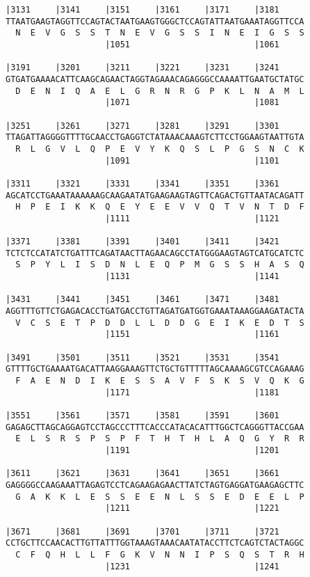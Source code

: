 \documentclass{article}
\begin{document}
\begin{Verbatim}
|3131     |3141     |3151     |3161     |3171     |3181     
TTAATGAAGTAGGTTCCAGTACTAATGAAGTGGGCTCCAGTATTAATGAAATAGGTTCCA
  N  E  V  G  S  S  T  N  E  V  G  S  S  I  N  E  I  G  S  S
                    |1051                         |1061     
  
|3191     |3201     |3211     |3221     |3231     |3241     
GTGATGAAAACATTCAAGCAGAACTAGGTAGAAACAGAGGGCCAAAATTGAATGCTATGC
  D  E  N  I  Q  A  E  L  G  R  N  R  G  P  K  L  N  A  M  L
                    |1071                         |1081     
  
|3251     |3261     |3271     |3281     |3291     |3301     
TTAGATTAGGGGTTTTGCAACCTGAGGTCTATAAACAAAGTCTTCCTGGAAGTAATTGTA
  R  L  G  V  L  Q  P  E  V  Y  K  Q  S  L  P  G  S  N  C  K
                    |1091                         |1101     
  
|3311     |3321     |3331     |3341     |3351     |3361     
AGCATCCTGAAATAAAAAAGCAAGAATATGAAGAAGTAGTTCAGACTGTTAATACAGATT
  H  P  E  I  K  K  Q  E  Y  E  E  V  V  Q  T  V  N  T  D  F
                    |1111                         |1121     
  
|3371     |3381     |3391     |3401     |3411     |3421     
TCTCTCCATATCTGATTTCAGATAACTTAGAACAGCCTATGGGAAGTAGTCATGCATCTC
  S  P  Y  L  I  S  D  N  L  E  Q  P  M  G  S  S  H  A  S  Q
                    |1131                         |1141     
  
|3431     |3441     |3451     |3461     |3471     |3481     
AGGTTTGTTCTGAGACACCTGATGACCTGTTAGATGATGGTGAAATAAAGGAAGATACTA
  V  C  S  E  T  P  D  D  L  L  D  D  G  E  I  K  E  D  T  S
                    |1151                         |1161     
  
|3491     |3501     |3511     |3521     |3531     |3541     
GTTTTGCTGAAAATGACATTAAGGAAAGTTCTGCTGTTTTTAGCAAAAGCGTCCAGAAAG
  F  A  E  N  D  I  K  E  S  S  A  V  F  S  K  S  V  Q  K  G
                    |1171                         |1181     
  
|3551     |3561     |3571     |3581     |3591     |3601     
GAGAGCTTAGCAGGAGTCCTAGCCCTTTCACCCATACACATTTGGCTCAGGGTTACCGAA
  E  L  S  R  S  P  S  P  F  T  H  T  H  L  A  Q  G  Y  R  R
                    |1191                         |1201     
  
|3611     |3621     |3631     |3641     |3651     |3661     
GAGGGGCCAAGAAATTAGAGTCCTCAGAAGAGAACTTATCTAGTGAGGATGAAGAGCTTC
  G  A  K  K  L  E  S  S  E  E  N  L  S  S  E  D  E  E  L  P
                    |1211                         |1221     
  
|3671     |3681     |3691     |3701     |3711     |3721     
CCTGCTTCCAACACTTGTTATTTGGTAAAGTAAACAATATACCTTCTCAGTCTACTAGGC
  C  F  Q  H  L  L  F  G  K  V  N  N  I  P  S  Q  S  T  R  H
                    |1231                         |1241     
  

\end{Verbatim}
\end{document}
